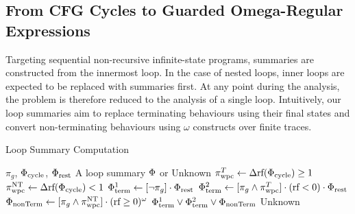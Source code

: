 {\subsection{From CFG Cycles to Guarded Omega-Regular Expressions }
\label{subsec:loop2wRE}

Targeting sequential non-recursive infinite-state programs, summaries are constructed from the innermost loop. In the case of nested loops, inner loops are expected to be 
replaced with summaries first. 
At any point during the analysis, the problem is therefore reduced to the analysis of a single loop. 
Intuitively, our loop summaries aim to replace terminating behaviours using their final states and convert non-terminating behaviours using $\omega$ constructs over finite traces. 





\begin{algorithm}[!b]
\caption{Loop Summary Computation}
\label{alg:loopsummary}
\begin{algorithmic}
\REQUIRE $\pi_g$, ${\mathrm{\Phi}}_{\text{cycle}}$, ${\mathrm{\Phi}}_{\text{rest}}$
\ENSURE A loop summary ${\mathrm{\Phi}}$ or Unknown
\STATE $\pi_{\text{wpc}}^T \gets \Delta \text{rf}({\mathrm{\Phi}}_{\text{cycle}}) \geq 1$
\STATE $\pi_{\text{wpc}}^{\text{NT}} \gets \Delta \text{rf}({\mathrm{\Phi}}_{\text{cycle}}) < 1$
\STATE ${\mathrm{\Phi}}_{\text{term}}^1 \gets [\neg \pi_g] \cdot {\ensuremath{\mathrm{\Phi}}}_{\text{rest}}$
\STATE ${\mathrm{\Phi}}_{\text{term}}^2 \gets [\pi_g \wedge \pi_{\text{wpc}}^T] \cdot (\text{rf} < 0) \cdot {\ensuremath{\mathrm{\Phi}}}_{\text{rest}}$
\STATE ${\mathrm{\Phi}}_{\text{nonTerm}} \gets [\pi_g \wedge \pi_{\text{wpc}}^{\text{NT}}] \cdot (\text{rf} \geq 0)^\omega$
\RETURN ${\mathrm{\Phi}}_{\text{term}}^1 \vee {\ensuremath{\mathrm{\Phi}}}_{\text{term}}^2 \vee {\ensuremath{\mathrm{\Phi}}}_{\text{nonTerm}}$
\ENDIF
\ENDFOR
\RETURN Unknown 
\end{algorithmic}
\end{algorithm}


}
